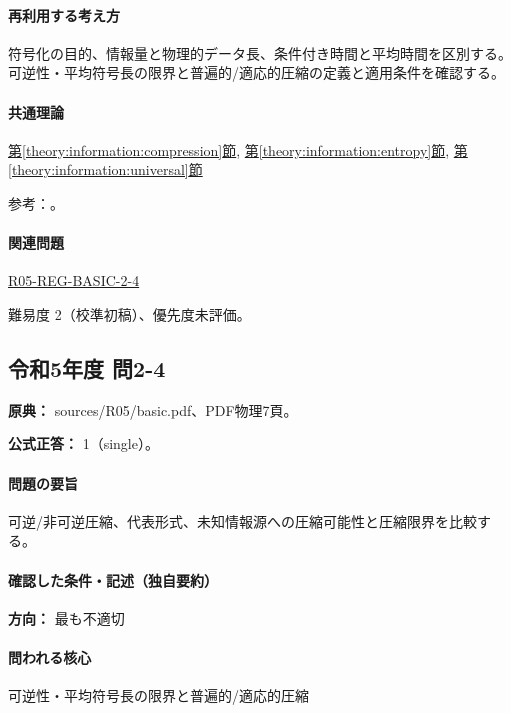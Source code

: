 \paragraph{再利用する考え方} 符号化の目的、情報量と物理的データ長、条件付き時間と平均時間を区別する。可逆性・平均符号長の限界と普遍的/適応的圧縮の定義と適用条件を確認する。

\paragraph{共通理論} \hyperref[theory:information:compression]{第\ref*{theory:information:compression}節}, \hyperref[theory:information:entropy]{第\ref*{theory:information:entropy}節}, \hyperref[theory:information:universal]{第\ref*{theory:information:universal}節}

\par 参考：\cite{info_deflate,info_lossless,info_universal,info_jpeg,info_mpeg}。

\paragraph{関連問題} \hyperref[q:r05-reg-basic-2-4]{R05-REG-BASIC-2-4}

\par 難易度 2（校準初稿）、優先度未評価。

\subsection{令和5年度 問2-4}
\label{q:r05-reg-basic-2-4}

\noindent\textbf{原典：} sources/R05/basic.pdf、PDF物理7頁。

\textbf{公式正答：} 1（single）。

\paragraph{問題の要旨} 可逆/非可逆圧縮、代表形式、未知情報源への圧縮可能性と圧縮限界を比較する。

\paragraph{確認した条件・記述（独自要約）}\mbox{}\par

\noindent\textbf{方向：} 最も不適切\par

\paragraph{問われる核心} 可逆性・平均符号長の限界と普遍的/適応的圧縮

